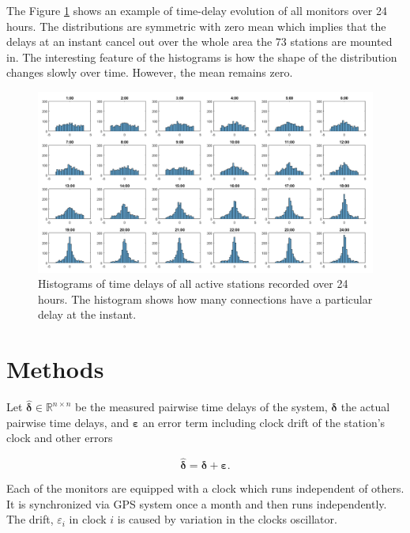 \documentclass[12pt,a4paper,english]{article}
\begin{document}
The Figure \ref{fig:histograms} shows an example of time-delay evolution of all monitors over 24 hours. The distributions are symmetric with zero mean which implies that the delays at an instant cancel out over the whole area the 73 stations are mounted in. The interesting feature of the histograms is how the shape of the distribution changes slowly over time. However, the mean remains zero.

\begin{figure}[ht]
  \begin{center}   
   \includegraphics[width=\textwidth]{hourlydelaydistributionoverallstationsforoneday.png}
  \end{center}
  \caption{Histograms of time delays of all active stations recorded over 24 hours. The histogram shows how many connections have a particular delay at the instant.}\label{fig:histograms}
\end{figure}



\section{Methods}


Let $\bm{\hat{\delta}} \in \mathbb{R}^{n\times n}$ be the measured pairwise time delays of the system, $\bm{\delta}$ the actual pairwise time delays, and $\bm{\varepsilon}$ an error term including clock drift of the station's clock and other errors

\begin{equation}
\bm{\hat{\delta}}  = \bm{\delta} + \bm{\varepsilon}.
\label{eq:model}
\end{equation}
 
Each of the monitors are equipped with a clock which runs independent of others. It is synchronized via GPS system once a month and then runs independently. The drift, $\varepsilon_i$ in clock $i$ is caused by variation in the clocks oscillator.  
\end{document}
